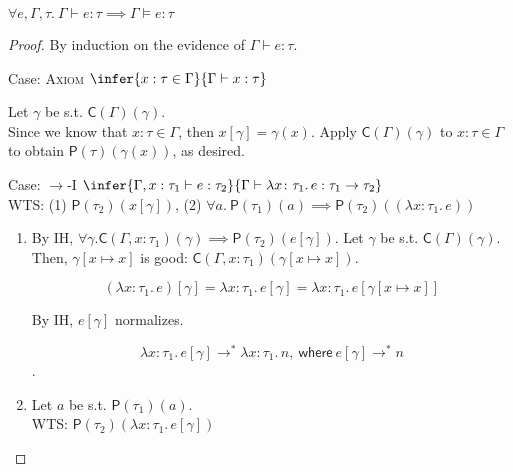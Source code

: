 \documentclass{lecturenotes}
\newcommand{\tabs}[3]{\ensuremath{\lambda #1 \colon #2.\,#3}}
\newcommand{\lr}[2]{\ensuremath{\mathsf{P}(#1)(#2)}}
\newcommand{\gdsubst}[2]{\ensuremath{\mathsf{C}(#1)(#2)}}
\newcommand{\proves}{\vdash}
\begin{document}
\begin{thm}[Fundamental]
  $\forall e, \Gamma, \tau.~\Gamma \proves e : \tau \implies \Gamma \vDash e : \tau$
\end{thm}
\begin{proof}
  By induction on the evidence of $\Gamma \proves e : \tau$.

  \item Case: \textsc{Axiom} $\infer{x : \tau \in \Gamma}{\Gamma \proves x : \tau}$
  
  Let $\gamma$ be s.t. $\gdsubst{\Gamma}{\gamma}$. \\
  
  Since we know that $x : \tau \in \Gamma$, then $x[\gamma] = \gamma(x)$.
  Apply $\gdsubst{\Gamma}{\gamma}$ to $x : \tau \in \Gamma$ to obtain $\lr{\tau}{\gamma(x)}$, as desired.

  \item Case: \textsc{$\rightarrow$-I} $\infer{\Gamma, x : \tau_1 \proves e : \tau_2}{\Gamma \proves \tabs{x}{\tau_1}{e} : \tau_1 \to \tau_2}$ \\

  WTS: (1) $\lr{\tau_2}{x[\gamma]}$, (2) $\forall a.~\lr{\tau_1}{a} \implies \lr{\tau_2}{(\tabs{x}{\tau_1}{e})}$ \\

  \begin{enumerate}[(1)]
    \item 
    
    By IH, $\forall \gamma. \gdsubst{\Gamma, x : \tau_1}{\gamma} \implies \lr{\tau_2}{e[\gamma]}$.
    Let $\gamma$ be s.t. $\gdsubst{\Gamma}{\gamma}$.
    Then, $\gamma[x \mapsto x]$ is good: $\gdsubst{\Gamma, x : \tau_1}{\gamma[x \mapsto x]}$.
  
    $$(\tabs{x}{\tau_1}{e})[\gamma] = \tabs{x}{\tau_1}{e[\gamma]} = \tabs{x}{\tau_1}{e[\gamma[x \mapsto x]]}$$
  
    \begin{nb}
    By IH, $e[\gamma]$ normalizes.
    \end{nb}

    $$\tabs{x}{\tau_1}{e[\gamma]} \to^\ast \tabs{x}{\tau_1}{n}\mathsf{,~where }~e[\gamma] \to^\ast n$$.

    \item
    
    Let $a$ be s.t. $\lr{\tau_1}{a}$. \\

    WTS: $\lr{\tau_2}{\tabs{x}{\tau_1}{e[\gamma]}}$ \\


\end{enumerate}
\end{proof}
\end{document}
